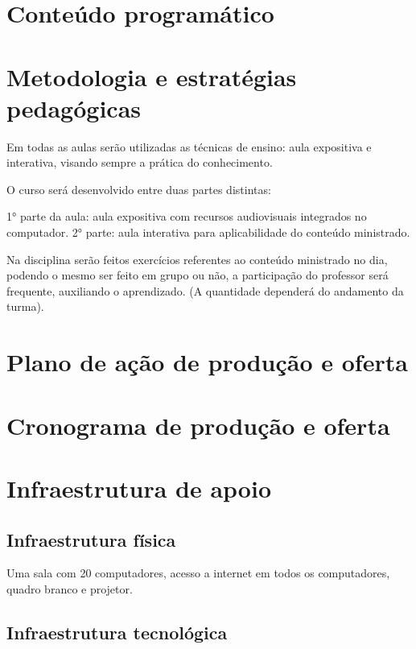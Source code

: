 \section{Conteúdo programático}



\newpage
\section{Metodologia e estratégias pedagógicas}

Em todas as aulas serão utilizadas as técnicas de ensino: aula expositiva e interativa, visando sempre a prática do conhecimento.

O curso será desenvolvido entre duas partes distintas:

1° parte da aula: aula expositiva com recursos audiovisuais integrados no computador.
2° parte: aula interativa para aplicabilidade do conteúdo ministrado.

Na disciplina serão feitos exercícios referentes ao conteúdo ministrado no dia, podendo o mesmo ser feito em grupo ou não, a participação do professor será frequente, auxiliando o aprendizado. (A quantidade dependerá do andamento da turma).


\section{Plano de ação de produção e oferta}



\section{Cronograma de produção e oferta}



\section{Infraestrutura de apoio}

\subsection{Infraestrutura física}

Uma sala com 20 computadores, acesso a internet em todos os computadores, quadro branco e projetor.

\subsection{Infraestrutura tecnológica}

